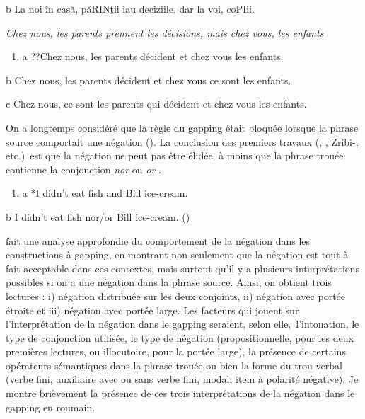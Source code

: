   b  La noi în casă, păRINții iau deciziile, dar la voi, coPIii.

    \textit{Chez nous, les parents prennent les décisions, mais chez vous, les enfants}


\begin{enumerate}
\item \label{bkm:Ref298089714}a   ??Chez nous, les parents décident et chez vous les enfants.


\end{enumerate}
  b  Chez nous, les parents décident et chez vous ce sont les enfants.

  c  Chez nous, ce sont les parents qui décident et chez vous les enfants.  

On a longtemps considéré que la règle du gapping était bloquée lorsque la phrase source comportait une négation (\citet{Ross1967}). La conclusion des premiers travaux (\citet{Ross1967}, \citet{Jackendoff1971}, Zribi-\citet{Hertz1986}, etc.)~est que la négation ne peut pas être élidée, à moins que la phrase trouée contienne la conjonction \textit{nor} ou \textit{or} . 


\begin{enumerate}
\item \label{bkm:Ref289290807}a   *I didn't eat fish and Bill ice-cream.          


\end{enumerate}
b  I didn't eat fish nor/or Bill ice-cream.           (\citet{Sag1976})

\citet{Repp2009} fait une analyse approfondie du comportement de la négation dans les constructions à gapping, en montrant non seulement que la négation est tout à fait acceptable dans ces contextes, mais surtout qu'il y a plusieurs interprétations possibles si on a une négation dans la phrase source. Ainsi, on obtient trois lectures : i) négation distribuée sur les deux conjoints, ii) négation avec portée étroite et iii) négation avec portée large. Les facteurs qui jouent sur l'interprétation de la négation dans le gapping seraient, selon elle,~l'intonation, le type de conjonction utilisée, le type de négation (propositionnelle, pour les deux premières lectures, ou illocutoire, pour la portée large), la présence de certains opérateurs sémantiques dans la phrase trouée ou bien la forme du trou verbal (verbe fini, auxiliaire avec ou sans verbe fini, modal, item à polarité négative). Je montre brièvement la présence de ces trois interprétations de la négation dans le gapping en roumain.

